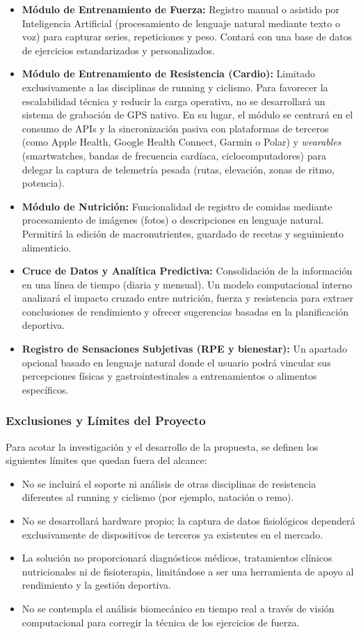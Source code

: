 \documentclass[12pt]{article}
\begin{document}
\begin{itemize}
    \item \textbf{Módulo de Entrenamiento de Fuerza:} Registro manual o asistido por Inteligencia Artificial (procesamiento de lenguaje natural mediante texto o voz) para capturar series, repeticiones y peso. Contará con una base de datos de ejercicios estandarizados y personalizados.
    \item \textbf{Módulo de Entrenamiento de Resistencia (Cardio):} Limitado exclusivamente a las disciplinas de running y ciclismo. Para favorecer la escalabilidad técnica y reducir la carga operativa, no se desarrollará un sistema de grabación de GPS nativo. En su lugar, el módulo se centrará en el consumo de APIs y la sincronización pasiva con plataformas de terceros (como Apple Health, Google Health Connect, Garmin o Polar) y \textit{wearables} (smartwatches, bandas de frecuencia cardíaca, ciclocomputadores) para delegar la captura de telemetría pesada (rutas, elevación, zonas de ritmo, potencia).
    \item \textbf{Módulo de Nutrición:} Funcionalidad de registro de comidas mediante procesamiento de imágenes (fotos) o descripciones en lenguaje natural. Permitirá la edición de macronutrientes, guardado de recetas y seguimiento alimenticio.
    \item \textbf{Cruce de Datos y Analítica Predictiva:} Consolidación de la información en una línea de tiempo (diaria y mensual). Un modelo computacional interno analizará el impacto cruzado entre nutrición, fuerza y resistencia para extraer conclusiones de rendimiento y ofrecer sugerencias basadas en la planificación deportiva.
    \item \textbf{Registro de Sensaciones Subjetivas (RPE y bienestar):} Un apartado opcional basado en lenguaje natural donde el usuario podrá vincular sus percepciones físicas y gastrointestinales a entrenamientos o alimentos específicos.
\end{itemize}

\subsubsection*{Exclusiones y Límites del Proyecto}
Para acotar la investigación y el desarrollo de la propuesta, se definen los siguientes límites que quedan fuera del alcance:
\begin{itemize}
    \item No se incluirá el soporte ni análisis de otras disciplinas de resistencia diferentes al running y ciclismo (por ejemplo, natación o remo).
    \item No se desarrollará hardware propio; la captura de datos fisiológicos dependerá exclusivamente de dispositivos de terceros ya existentes en el mercado.
    \item La solución no proporcionará diagnósticos médicos, tratamientos clínicos nutricionales ni de fisioterapia, limitándose a ser una herramienta de apoyo al rendimiento y la gestión deportiva.
    \item No se contempla el análisis biomecánico en tiempo real a través de visión computacional para corregir la técnica de los ejercicios de fuerza.
\end{itemize}
\end{document}
